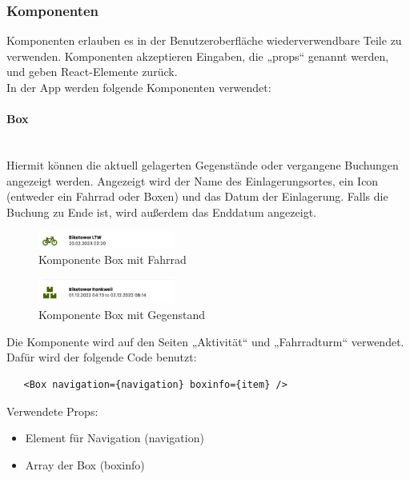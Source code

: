 \subsubsection{Komponenten}
Komponenten erlauben es in der Benutzeroberfläche wiederverwendbare Teile zu verwenden. Komponenten akzeptieren Eingaben, die „props“ genannt werden, und geben React-Elemente zurück.\cite{komponenten} \\
In der App werden folgende Komponenten verwendet: \\

\paragraph{Box}\mbox{}\\
Hiermit können die aktuell gelagerten Gegenstände oder vergangene Buchungen angezeigt werden. Angezeigt wird der Name des Einlagerungsortes, ein Icon (entweder ein Fahrrad oder Boxen) und das Datum der Einlagerung. Falls die Buchung zu Ende ist, wird außerdem das Enddatum angezeigt.\\
\begin{figure}[H]
    \centering
    \includegraphics[width=0.4\textwidth]{images/app-screenshots/boxwithbike.png}
    \caption{Komponente Box mit Fahrrad}
    \label{fig:boxwithbike}
\end{figure}
\begin{figure}[H]
    \centering
    \includegraphics[width=0.4\textwidth]{images/app-screenshots/boxwithitem.png}
    \caption{Komponente Box mit Gegenstand}
    \label{fig:boxwithitem}
\end{figure}
Die Komponente wird auf den Seiten „Aktivität“ und „Fahrradturm“ verwendet. Dafür wird der folgende Code benutzt:\\

\begin{verbatim}
   <Box navigation={navigation} boxinfo={item} />
\end{verbatim}

Verwendete Props:
\begin{itemize}
    \item Element für Navigation (navigation)
    \item Array der Box (boxinfo)
\end{itemize}

